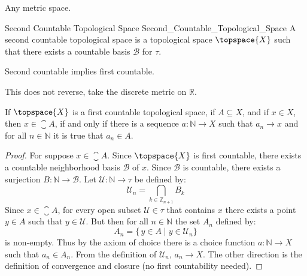 \documentclass{article}                                                        %
\begin{document}
        \begin{example}
            Any metric space.
        \end{example}
        \begin{fdefinition}{Second Countable Topological Space}
                           {Second_Countable_Topological_Space}
            A second countable topological space is a topological space
            $\topspace{X}$ such that there exists a countable basis
            $\mathcal{B}$ for $\tau$.
        \end{fdefinition}
        \begin{theorem}
            Second countable implies first countable.
        \end{theorem}
        \begin{example}
            This does not reverse, take the discrete metric on $\mathbb{R}$.
        \end{example}
        \begin{theorem}
            If $\topspace{X}$ is a first countable topological space, if
            $A\subseteq{X}$, and if $x\in{X}$, then $x\in\closure{A}$, if and
            only if there is a sequence $a:\mathbb{N}\rightarrow{X}$ such that
            $a_{n}\rightarrow{x}$ and for all $n\in\mathbb{N}$ it is true that
            $a_{n}\in{A}$.
        \end{theorem}
        \begin{proof}
            For suppose $x\in\closure{A}$. Since $\topspace{X}$ is first
            countable, there exists a countable neighborhood basis $\mathcal{B}$
            of $x$. Since $\mathcal{B}$ is countable, there exists a surjection
            $B:\mathbb{N}\rightarrow\mathcal{B}$. Let
            $\mathcal{U}:\mathbb{N}\rightarrow\tau$ be defined by:
            \begin{equation}
                \mathcal{U}_{n}=\bigcap_{k\in\mathbb{Z}_{n+1}}B_{k}
            \end{equation}
            Since $x\in\closure{A}$, for every open subset $\mathcal{U}\in\tau$
            that contains $x$ there exists a point $y\in{A}$ such that
            $y\in\mathcal{U}$. But then for all $n\in\mathbb{N}$ the set
            $A_{n}$ defined by:
            \begin{equation}
                A_{n}=\{\,y\in{A}\;|\;y\in\mathcal{U}_{n}\}
            \end{equation}
            is non-empty. Thus by the axiom of choice there is a choice function
            $a:\mathbb{N}\rightarrow{X}$ such that $a_{n}\in{A}_{n}$. From the
            definition of $\mathcal{U}_{n}$, $a_{n}\rightarrow{X}$. The other
            direction is the definition of convergence and closure
            (no first countability needed).
        \end{proof}
\end{document}
